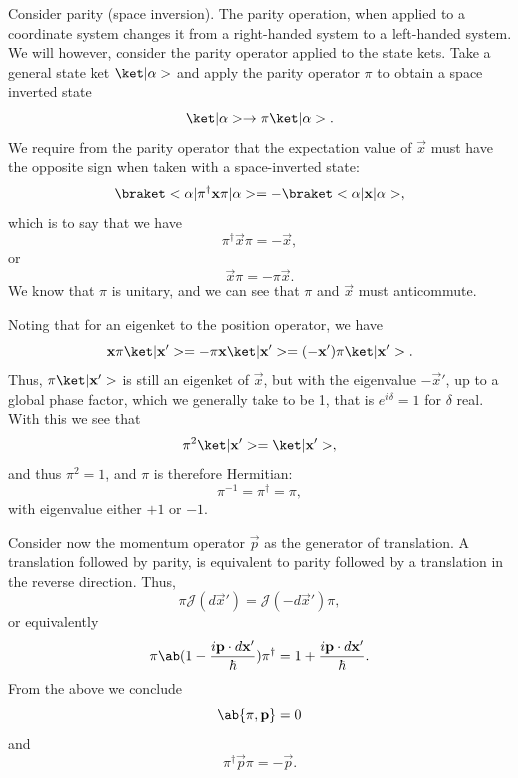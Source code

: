 Consider parity (space inversion). The parity operation, when applied to a coordinate system changes it from a right-handed system to a left-handed system. We will however, consider the parity operator applied to the state kets. Take a general state ket $\k{\alpha}$ and apply the parity operator $\pi$ to obtain a space inverted state
\begin{equation}
    \k{\alpha} \to \pi\k{\alpha}.
\end{equation}
We require from the parity operator that the expectation value of $\vec{x}$ must have the opposite sign when taken with a space-inverted state:
\begin{equation}
    \bkop{\alpha}{\pi^\dagger \vec{x} \pi}{\alpha} = - \bkop{\alpha}{\vec{x}}{\alpha},
\end{equation}
which is to say that we have
\begin{equation}
    \pi^\dagger \vec{x} \pi = - \vec{x},
\end{equation}
or
\begin{equation}
    \vec{x}\pi = -\pi \vec{x}.
\end{equation}
We know that $\pi$ is unitary, and we can see that $\pi$ and $\vec{x}$ must anticommute.

Noting that for an eigenket to the position operator, we have
\begin{equation}
    \vec{x}\pi \k{\vec{x}'} = - \pi \vec{x}\k{\vec{x}'} = (-\vec{x}')\pi \k{\vec{x}'}.
\end{equation}
Thus,  $\pi\k{\vec{x}'}$ is still an eigenket of $\vec{x}$, but with the eigenvalue $-\vec{x}'$, up to a global phase factor, which we generally take to be 1, that is $e^{i\delta} = 1$ for $\delta$ real. With this we see that
\begin{equation}
    \pi^2\k{\vec{x}'} = \k{\vec{x}'},
\end{equation}
and thus $\pi^2 = 1$, and $\pi$ is therefore Hermitian:
\begin{equation}
    \pi^{-1} = \pi^\dagger = \pi,
\end{equation}
with eigenvalue either $+1$ or $-1$.

Consider now the momentum operator $\vec{p}$ as the generator of translation. A translation followed by parity, is equivalent to parity followed by a translation in the reverse direction. Thus,
\begin{equation}
    \pi \mathscr{J}(d\vec{x}') = \mathscr{J}(-d\vec{x}') \pi,
\end{equation}
or equivalently
\begin{equation}
    \pi \ab(1 - \frac{i \vec{p}\cdot d\vec{x}'}{\hbar})\pi^\dagger = 1 + \frac{i\vec{p}\cdot d \vec{x}'}{\hbar}.
\end{equation}
From the above we conclude
\begin{equation}
    \acomm{\pi}{\vec{p}} = 0
\end{equation}
and
\begin{equation}
    \pi^\dagger\vec{p}\pi = -\vec{p}.
\end{equation}

